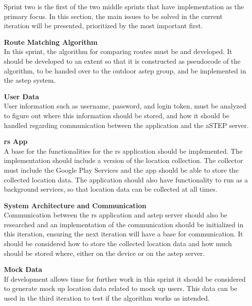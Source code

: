 Sprint two is the first of the two middle sprints that have implementation as the primary focus. In this section, the main issues to be solved in the current iteration will be presented, prioritized by the most important first.

\textbf{Route Matching Algorithm}\\
In this sprint, the algorithm for comparing routes must be and developed. 
It should be developed to an extent so that it is constructed as pseudocode of the algorithm, to be handed over to the outdoor \gls{astep} group, and be implemented in the \gls{astep} system.

\textbf{User Data}\\
User information such as username, password, and login token, must be analyzed to figure out where this information should be stored, and how it should be handled regarding communication between the application and the aSTEP server. 

\textbf{\gls{rs} App}\\
A base for the functionalities for the \gls{rs} application should be implemented. 
The implementation should include a version of the location collection.
The collector must include the Google Play Services and the app should be able to store the collected location data. 
The application should also have functionality to run as a background services, so that location data can be collected at all times.

\textbf{System Architecture and Communication}\\
Communication between the \gls{rs} application and \gls{astep} server should also be researched and an implementation of the communication should be initialized in this iteration, ensuring the next iteration will have a base for communication. 
It should be considered how to store the collected location data and how much should be stored where, either on the device or on the \gls{astep} server.

\textbf{Mock Data}\\
If development allows time for further work in this sprint it should be considered to generate mock up location data related to mock up users. 
This data can be used in the third iteration to test if the algorithm works as intended.